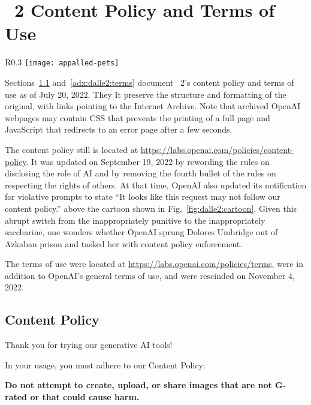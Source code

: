 
\section{\dalle~2 Content Policy and Terms of Use}
\label{adx:dalle2:policies}

\begin{wrapfigure}[9]{R}{0.3\textwidth}
\centering
\texttt{[image: appalled-pets]}
\caption{Be nice to \dalle's pets!}\label{fig:dalle2:cartoon}
\end{wrapfigure}

Sections~\ref{adx:dalle2:contentpolicy} and~\ref{adx:dalle2:terms} document
\dalle~2's content policy and terms of use as of July 20, 2022. They It preserve
the structure and formatting of the original, with links pointing to the
Internet Archive. Note that archived OpenAI webpages may contain CSS that
prevents the printing of a full page and JavaScript that redirects to an error
page after a few seconds.

The content policy still is located at
\url{https://labs.openai.com/policies/content-policy}. It was updated on
September 19, 2022 by rewording the rules on disclosing the role of AI and by
removing the fourth bullet of the rules on respecting the rights of others. At
that time, OpenAI also updated its notification for violative prompts to state
``It looks like this request may not follow our content policy.'' above the
cartoon shown in Fig.~\ref{fig:dalle2:cartoon}. Given this abrupt switch from
the inappropriately punitive to the inappropriately saccharine, one wonders
whether OpenAI sprung Dolores Umbridge out of Azkaban prison and tasked her with
content policy enforcement.

The terms of use were located at
\url{https://labs.openai.com/policies/terms}, were in addition to OpenAI's
general terms of use, and were rescinded on November 4, 2022.


\subsection{Content Policy}
\label{adx:dalle2:contentpolicy}

Thank you for trying our generative AI tools!

\noindent In your usage, you must adhere to our Content Policy:

\vspace{.5em}\noindent\textbf{Do not attempt to create, upload, or share images
    that are not G-rated or that could cause harm.}


